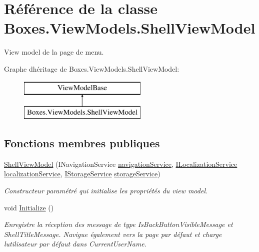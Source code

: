 \hypertarget{class_boxes_1_1_view_models_1_1_shell_view_model}{}\section{Référence de la classe Boxes.\+View\+Models.\+Shell\+View\+Model}
\label{class_boxes_1_1_view_models_1_1_shell_view_model}


View model de la page de menu.  


Graphe d\textquotesingle{}héritage de Boxes.\+View\+Models.\+Shell\+View\+Model\+:\begin{figure}[H]
\begin{center}
\leavevmode
\includegraphics[height=2.000000cm]{class_boxes_1_1_view_models_1_1_shell_view_model}
\end{center}
\end{figure}
\subsection*{Fonctions membres publiques}
\begin{DoxyCompactItemize}
\item 
\hyperlink{class_boxes_1_1_view_models_1_1_shell_view_model_a1ba248d94544bb16d7f83cea2ad9ef0b}{Shell\+View\+Model} (I\+Navigation\+Service \hyperlink{class_boxes_1_1_view_models_1_1_shell_view_model_a6d3eb71e962c5743cbe88c6965bb0d56}{navigation\+Service}, \hyperlink{interface_boxes_1_1_services_1_1_localization_1_1_i_localization_service}{I\+Localization\+Service} \hyperlink{class_boxes_1_1_view_models_1_1_shell_view_model_affb3ef1bb3aec55f80714a2fa4fd79a1}{localization\+Service}, \hyperlink{interface_boxes_1_1_services_1_1_storage_1_1_i_storage_service}{I\+Storage\+Service} \hyperlink{class_boxes_1_1_view_models_1_1_shell_view_model_a8be9f33243fd2a7427d2d36f1276d3a5}{storage\+Service})
\begin{DoxyCompactList}\small\item\em Constructeur paramétré qui initialise les propriétés du view model. \end{DoxyCompactList}\item 
void \hyperlink{class_boxes_1_1_view_models_1_1_shell_view_model_a72fcbd032d572b6505a8b603527f7252}{Initialize} ()
\begin{DoxyCompactList}\small\item\em Enregistre la réception des message de type Is\+Back\+Button\+Visible\+Message et Shell\+Title\+Message. Navigue également vers la page par défaut et charge l\textquotesingle{}utilisateur par défaut dans {\ttfamily Current\+User\+Name}. \end{DoxyCompactList}\end{DoxyCompactItemize}
